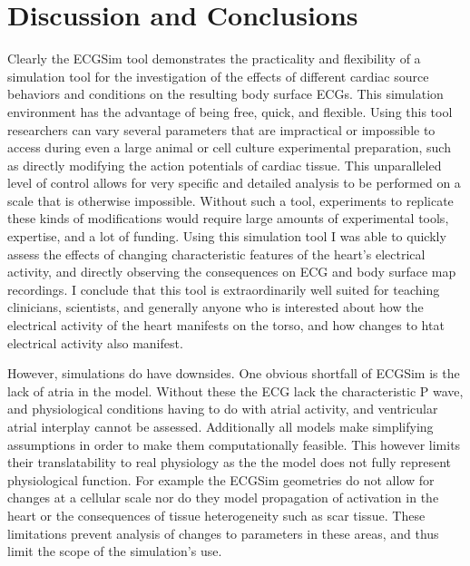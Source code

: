 \documentclass[12pt]{article}
\begin{document}
\section{Discussion and Conclusions}


Clearly the ECGSim tool demonstrates the practicality and flexibility of a simulation tool for the investigation of the effects of different cardiac source behaviors and conditions on the resulting body surface ECGs. This simulation environment has the advantage of being free, quick, and flexible. Using this tool researchers can vary several parameters that are impractical or impossible to access during even a large animal or cell culture experimental preparation, such as directly modifying the action potentials of cardiac tissue. This unparalleled level of control allows for very specific and detailed analysis to be performed on a scale that is otherwise impossible. Without such a tool, experiments to replicate these kinds of modifications would require large amounts of experimental tools, expertise, and a lot of funding. Using this simulation tool I was able to quickly assess the effects of changing characteristic features of the heart's electrical activity, and directly observing the consequences on ECG and body surface map recordings. I conclude that this tool is extraordinarily well suited for teaching clinicians, scientists, and generally anyone who is interested about how the electrical activity of the heart manifests on the torso, and how changes to htat electrical activity also manifest.

 However, simulations do have downsides. One obvious shortfall of ECGSim is the lack of atria in the model. Without these the ECG lack the characteristic P wave, and physiological conditions having to do with atrial activity, and ventricular atrial interplay cannot be assessed.  Additionally all models make simplifying assumptions in order to make them computationally feasible. This however limits their translatability to real physiology as the the model does not fully represent physiological function. For example the ECGSim geometries do not allow for changes at a cellular scale nor do they model propagation of activation in the heart or the consequences of tissue heterogeneity such as scar tissue. These limitations prevent analysis of changes to parameters in these areas, and thus limit the scope of the simulation's use.






\end{document}
